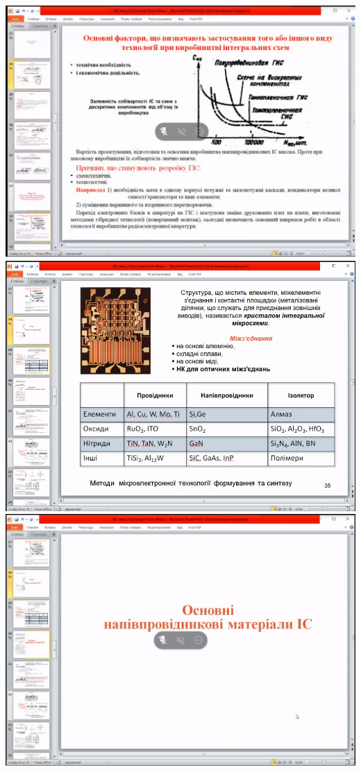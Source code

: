 \documentclass[a4paper,14pt]{extreport}
\begin{document}
\begin{center}
\includegraphics[scale = 0.75]{4.png}
\includegraphics[scale = 0.75]{5.png}
\includegraphics[scale = 0.75]{6.png}

\end{center}
\end{document}

